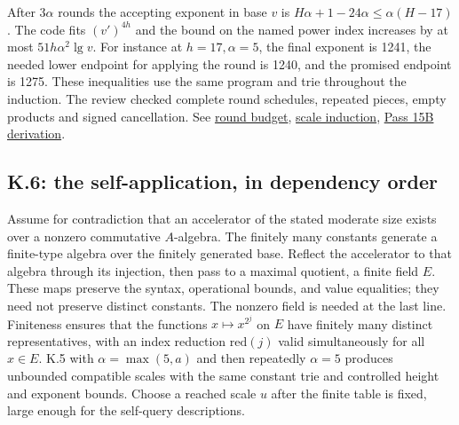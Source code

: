 \documentclass[11pt,letterpaper]{article}
\theoremstyle{definition}\newtheorem{definition}[theorem]{Definition}\newtheorem{example}[theorem]{Example}
\theoremstyle{remark}\newtheorem{remark}[theorem]{Remark}
\newcommand{\pub}[3]{\href{https://github.com/anthropics/formal-math/blob/11b6c7e3c927df2658f513b6b68ea7f8929c62c5/vp-vnp/#1\#L#2}{#3}}
\newcommand{\aud}[2]{\href{https://github.com/nousentllc/VP-VNP-Review/blob/567303d0bcf4f9d54390437b137752446e58ccd6/#1}{#2}}
\begin{document}
After $3\alpha$ rounds the accepting exponent in base $v$ is $H\alpha+1-24\alpha\le\alpha(H-17)$. The code fits $(v')^{4h}$ and the bound on the named power index increases by at most $51h\alpha^2\lg v$. For instance at $h=17,\alpha=5$, the final exponent is 1241, the needed lower endpoint for applying the round is 1240, and the promised endpoint is 1275. These inequalities use the same program and trie throughout the induction. The review checked complete round schedules, repeated pieces, empty products and signed cancellation. See \pub{Paper/Next.lean}{63}{round budget}, \pub{Paper/Next.lean}{270}{scale induction}, \aud{report/pass15-k5.tex}{Pass 15B derivation}.

\subsection{K.6: the self-application, in dependency order}\label{sec:contradiction}
Assume for contradiction that an accelerator of the stated moderate size exists over a nonzero commutative $A$-algebra. The finitely many constants generate a finite-type algebra over the finitely generated base. Reflect the accelerator to that algebra through its injection, then pass to a maximal quotient, a finite field $E$. These maps preserve the syntax, operational bounds, and value equalities; they need not preserve distinct constants. The nonzero field is needed at the last line. Finiteness ensures that the functions $x\mapsto x^{2^j}$ on $E$ have finitely many distinct representatives, with an index reduction $\mathrm{red}(j)$ valid simultaneously for all $x\in E$. K.5 with $\alpha=\max(5,a)$ and then repeatedly $\alpha=5$ produces unbounded compatible scales with the same constant trie and controlled height and exponent bounds. Choose a reached scale $u$ after the finite table is fixed, large enough for the self-query descriptions.
\end{document}
